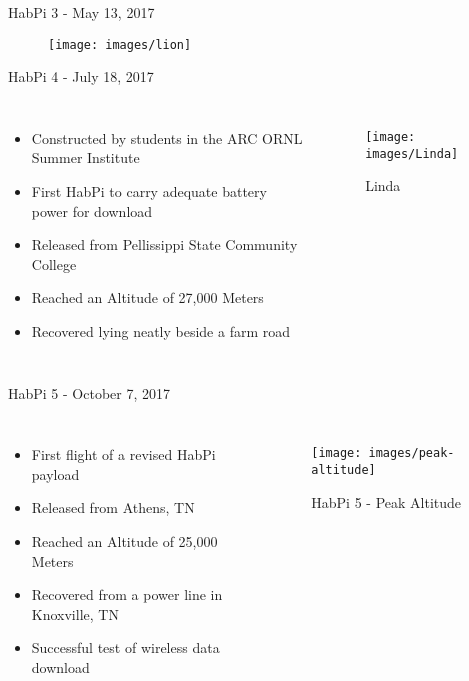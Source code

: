 \documentclass{beamer}[handout]
\begin{document}
\begin{frame}{HabPi 3 - May 13, 2017}
    \begin{figure}
        \centering
        \texttt{[image: images/lion]}
    \end{figure}
\end{frame}

\begin{frame}{HabPi 4 - July 18, 2017}
    \begin{columns}[t]
        \begin{itemize}
            \item Constructed by students in the ARC ORNL Summer Institute
	    \item First HabPi to carry adequate battery power for download
	    \item Released from Pellissippi State Community College
            \item Reached an Altitude of 27,000 Meters 
	    \item Recovered lying neatly beside a farm road
        \end{itemize}

        \begin{figure}
            \centering
            \texttt{[image: images/Linda]}
            \caption{\tiny Linda}
        \end{figure}
    \end{columns}
\end{frame}

\begin{frame}{HabPi 5 - October 7, 2017}
    \begin{columns}[t]
        \begin{itemize}
            \item First flight of a revised HabPi payload
	    \item Released from Athens, TN
            \item Reached an Altitude of 25,000 Meters 
	    \item Recovered from a power line in Knoxville, TN
	    \item Successful test of wireless data download
        \end{itemize}

        \begin{figure}
            \centering
            \texttt{[image: images/peak-altitude]}
            \caption{\tiny HabPi 5 - Peak Altitude}
        \end{figure}
    \end{columns}
\end{frame}
\end{document}
